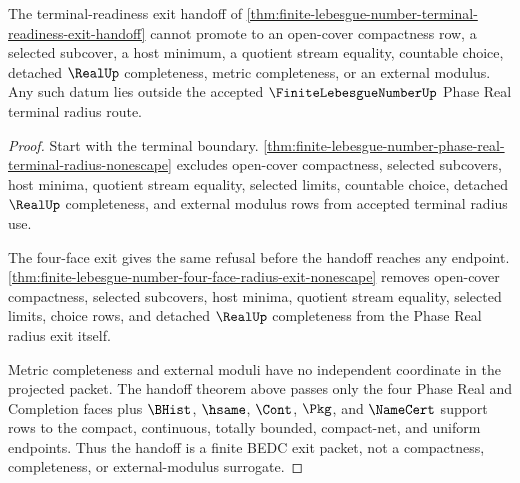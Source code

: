 \begin{theorem}
\label{thm:finite-lebesgue-number-terminal-readiness-no-completeness-promotion}
The terminal-readiness exit handoff of \autoref{thm:finite-lebesgue-number-terminal-readiness-exit-handoff} cannot promote to an open-cover compactness row, a selected subcover, a host minimum, a quotient stream equality, countable choice, detached $\RealUp$ completeness, metric completeness, or an external modulus. Any such datum lies outside the accepted $\FiniteLebesgueNumberUp$ Phase Real terminal radius route.
\end{theorem}
\begin{proof}
Start with the terminal boundary. \autoref{thm:finite-lebesgue-number-phase-real-terminal-radius-nonescape} excludes open-cover compactness, selected subcovers, host minima, quotient stream equality, selected limits, countable choice, detached $\RealUp$ completeness, and external modulus rows from accepted terminal radius use.

The four-face exit gives the same refusal before the handoff reaches any endpoint. \autoref{thm:finite-lebesgue-number-four-face-radius-exit-nonescape} removes open-cover compactness, selected subcovers, host minima, quotient stream equality, selected limits, choice rows, and detached $\RealUp$ completeness from the Phase Real radius exit itself.

Metric completeness and external moduli have no independent coordinate in the projected packet. The handoff theorem above passes only the four Phase Real and Completion faces plus $\BHist$, $\hsame$, $\Cont$, $\Pkg$, and $\NameCert$ support rows to the compact, continuous, totally bounded, compact-net, and uniform endpoints. Thus the handoff is a finite BEDC exit packet, not a compactness, completeness, or external-modulus surrogate.
\end{proof}
